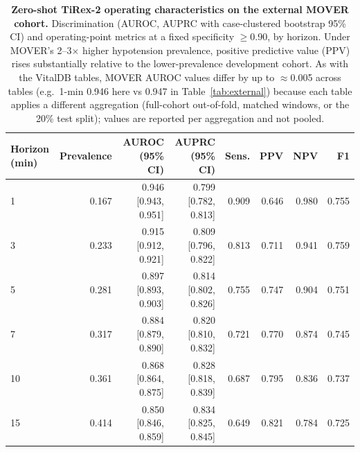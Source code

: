 \begin{table}[ht]
\centering\footnotesize
\caption{\textbf{Zero-shot TiRex-2 operating characteristics on the external MOVER cohort.} Discrimination (AUROC, AUPRC with case-clustered bootstrap 95\% CI) and operating-point metrics at a fixed specificity $\geq$0.90, by horizon. Under MOVER's 2--3$\times$ higher hypotension prevalence, positive predictive value (PPV) rises substantially relative to the lower-prevalence development cohort. As with the VitalDB tables, MOVER AUROC values differ by up to $\approx$0.005 across tables (e.g.\ 1-min 0.946 here vs 0.947 in Table~\ref{tab:external}) because each table applies a different aggregation (full-cohort out-of-fold, matched windows, or the 20\% test split); values are reported per aggregation and not pooled.}
\label{tab:mover_opchar}
\begin{tabular}{lrrrrrrr}
\toprule
Horizon (min) & Prevalence & AUROC (95\% CI) & AUPRC (95\% CI) & Sens. & PPV & NPV & F1 \\
\midrule
1 & 0.167 & 0.946 [0.943, 0.951] & 0.799 [0.782, 0.813] & 0.909 & 0.646 & 0.980 & 0.755 \\
3 & 0.233 & 0.915 [0.912, 0.921] & 0.809 [0.796, 0.822] & 0.813 & 0.711 & 0.941 & 0.759 \\
5 & 0.281 & 0.897 [0.893, 0.903] & 0.814 [0.802, 0.826] & 0.755 & 0.747 & 0.904 & 0.751 \\
7 & 0.317 & 0.884 [0.879, 0.890] & 0.820 [0.810, 0.832] & 0.721 & 0.770 & 0.874 & 0.745 \\
10 & 0.361 & 0.868 [0.864, 0.875] & 0.828 [0.818, 0.839] & 0.687 & 0.795 & 0.836 & 0.737 \\
15 & 0.414 & 0.850 [0.846, 0.859] & 0.834 [0.825, 0.845] & 0.649 & 0.821 & 0.784 & 0.725 \\
\bottomrule
\end{tabular}
\end{table}

